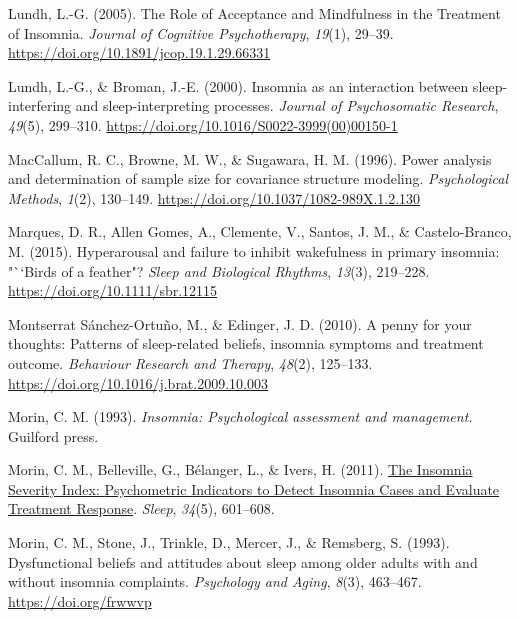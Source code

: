 \documentclass[
  ,doc,11pt, twoside,floatsintext]{apa6}
\newlength{\cslhangindent}
\newlength{\cslentryspacingunit} %
\newenvironment{CSLReferences}[2] %
 {%
  \setlength{\parindent}{0pt}
  \ifodd #1
  \let\oldpar\par
  \def\par{\hangindent=\cslhangindent\oldpar}
  \fi
  \setlength{\parskip}{#2\cslentryspacingunit}
 }%
 {}
\begin{document}
\begin{CSLReferences}{1}{0}
\leavevmode{}%
Lundh, L.-G. (2005). The {Role} of {Acceptance} and {Mindfulness} in the {Treatment} of {Insomnia}. \emph{Journal of Cognitive Psychotherapy}, \emph{19}(1), 29--39. \url{https://doi.org/10.1891/jcop.19.1.29.66331}

\leavevmode{}%
Lundh, L.-G., \& Broman, J.-E. (2000). Insomnia as an interaction between sleep-interfering and sleep-interpreting processes. \emph{Journal of Psychosomatic Research}, \emph{49}(5), 299--310. \url{https://doi.org/10.1016/S0022-3999(00)00150-1}

\leavevmode{}%
MacCallum, R. C., Browne, M. W., \& Sugawara, H. M. (1996). Power analysis and determination of sample size for covariance structure modeling. \emph{Psychological Methods}, \emph{1}(2), 130--149. \url{https://doi.org/10.1037/1082-989X.1.2.130}

\leavevmode{}%
Marques, D. R., Allen Gomes, A., Clemente, V., Santos, J. M., \& Castelo-Branco, M. (2015). Hyperarousal and failure to inhibit wakefulness in primary insomnia: "``Birds of a feather"? \emph{Sleep and Biological Rhythms}, \emph{13}(3), 219--228. \url{https://doi.org/10.1111/sbr.12115}

\leavevmode{}%
Montserrat Sánchez-Ortuño, M., \& Edinger, J. D. (2010). A penny for your thoughts: {Patterns} of sleep-related beliefs, insomnia symptoms and treatment outcome. \emph{Behaviour Research and Therapy}, \emph{48}(2), 125--133. \url{https://doi.org/10.1016/j.brat.2009.10.003}

\leavevmode{}%
Morin, C. M. (1993). \emph{Insomnia: Psychological assessment and management.} Guilford press.

\leavevmode{}%
Morin, C. M., Belleville, G., Bélanger, L., \& Ivers, H. (2011). \href{https://www.ncbi.nlm.nih.gov/pmc/articles/PMC3079939}{The {Insomnia Severity Index}: {Psychometric Indicators} to {Detect Insomnia Cases} and {Evaluate Treatment Response}}. \emph{Sleep}, \emph{34}(5), 601--608.

\leavevmode{}%
Morin, C. M., Stone, J., Trinkle, D., Mercer, J., \& Remsberg, S. (1993). Dysfunctional beliefs and attitudes about sleep among older adults with and without insomnia complaints. \emph{Psychology and Aging}, \emph{8}(3), 463--467. \url{https://doi.org/frwwvp}


\end{CSLReferences}
\end{document}
